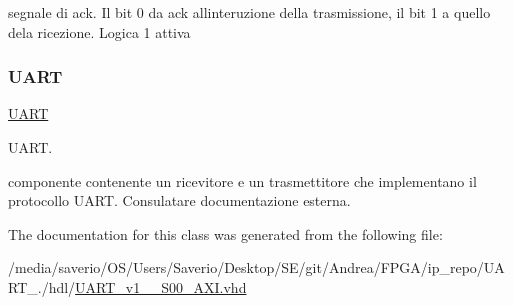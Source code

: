 segnale di ack. Il bit 0 da ack all\textquotesingle{}interuzione della trasmissione, il bit 1 a quello dela ricezione. Logica 1 attiva \mbox{\label{classUART__v1__0__S00__AXI_1_1arch__imp_a6f88b8988ee3bab3eaaa301212c7f804}} 
\subsubsection{\texorpdfstring{U\+A\+RT}{UART}}
{\footnotesize\ttfamily \hyperlink{classUART__v1__0__S00__AXI_1_1arch__imp_a6f88b8988ee3bab3eaaa301212c7f804}{U\+A\+RT} {\bfseries \textcolor{vhdlchar}{ }} \hspace{0.3cm}{\ttfamily [Component]}}



U\+A\+RT. 

componente contenente un ricevitore e un trasmettitore che implementano il protocollo U\+A\+RT. Consulatare documentazione esterna. 

The documentation for this class was generated from the following file\+:\begin{DoxyCompactItemize}
\item 
/media/saverio/\+O\+S/\+Users/\+Saverio/\+Desktop/\+S\+E/git/\+Andrea/\+F\+P\+G\+A/ip\+\_\+repo/\+U\+A\+R\+T\+\_./hdl/\hyperlink{UART__v1__0__S00__AXI_8vhd}{U\+A\+R\+T\+\_\+v1\+\_\+\_\+\+S00\+\_\+\+A\+X\+I.\+vhd}\end{DoxyCompactItemize}
